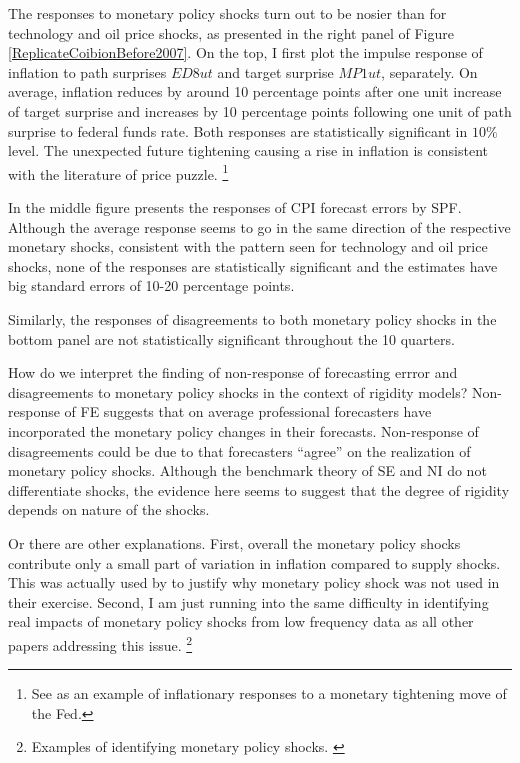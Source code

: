 \documentclass[]{article}
\begin{document}
	The responses to monetary policy shocks turn out to be nosier than for technology and oil price shocks, as presented in the right panel of Figure \ref{ReplicateCoibionBefore2007}. On the top, I first plot the impulse response of inflation to path surprises $ED8ut$ and target surprise $MP1ut$, separately. On average, inflation reduces by around 10 percentage points after one unit increase of target surprise and increases by 10 percentage points following one unit of path surprise to federal funds rate. Both responses are  statistically significant in $10\%$  level. The unexpected future tightening causing a rise in inflation is consistent with the literature of price puzzle. \footnote{See \cite{nakamura2018high} as an example of inflationary responses to a monetary tightening move of the Fed.}
	
	In the middle figure presents the responses of CPI forecast errors by SPF.  Although the average response seems to go in the same direction of the respective monetary shocks, consistent with the pattern seen for technology and oil price shocks, none of the responses are statistically significant and the estimates have big standard errors of 10-20 percentage points.  
	
	Similarly, the responses of disagreements to both monetary policy shocks in the bottom panel are not statistically significant throughout the 10 quarters.  
	
	How do we interpret the finding of non-response of forecasting errror and disagreements to monetary policy shocks in the context of rigidity models? Non-response of FE suggests that on average professional forecasters have incorporated the monetary policy changes in their forecasts. Non-response of disagreements could be due to that forecasters ``agree'' on the realization of monetary policy shocks. Although the benchmark theory of SE and NI do not differentiate shocks, the evidence here seems to suggest that the degree of rigidity depends on  nature of the shocks. 
	
	Or there are other explanations.  First, overall the monetary policy shocks contribute only a small part of variation in inflation compared to supply shocks. This was actually used by \cite{coibion2012can} to justify why monetary policy shock was not used in their exercise.  Second,  I am just running into the same difficulty in identifying real impacts of monetary policy shocks from low frequency data as all other papers addressing this issue. \footnote{Examples of identifying monetary policy shocks. \cite{xxx} } 
	
\end{document}
